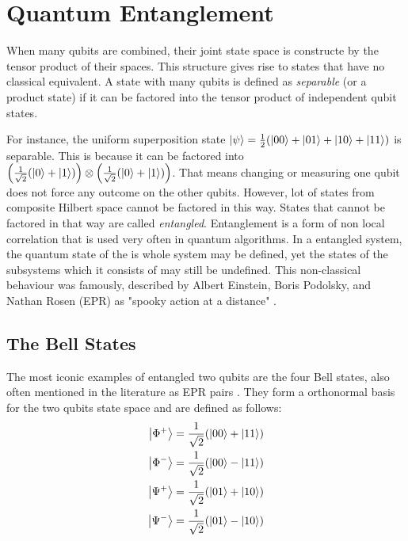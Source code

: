 \section{Quantum Entanglement}

When many qubits are combined, their joint state space is constructe by the tensor product of their spaces.
This structure gives rise to states that have no classical equivalent.
%
%
A state with many qubits is defined as \textit{separable} (or a product state) 
if it can be factored into the tensor product of independent qubit states.
%
%

For instance, the uniform superposition state $\ket{\psi} = \frac{1}{2}(\ket{00} + \ket{01} + \ket{10} + \ket{11})$ is separable.
This is because it can be factored into 
%
%
$\left(\frac{1}{\sqrt{2}}(\ket{0} + \ket{1})\right) \otimes \left(\frac{1}{\sqrt{2}}(\ket{0} + \ket{1})\right)$. 
%
%
That means changing or measuring one qubit does not force any outcome on the other qubits.
%
%
However, lot of states from composite Hilbert space cannot be factored in this way.
%
%
States that cannot be factored in that way are called \textit{entangled}.
%
%
Entanglement is a form of non local correlation that is used very often in quantum algorithms.
%
%
In a entangled system, the quantum state of the  is whole system may be defined, 
yet the states of the subsystems which it consists of may still be undefined.
%
%
This non-classical behaviour was famously, described by 
Albert Einstein, Boris Podolsky, and Nathan Rosen (EPR) as "spooky action at a distance" \cite{einstein1935}.
%
%
\subsection{The Bell States}

The most iconic examples of entangled two qubits are the four Bell states, 
also often mentioned in the literature as EPR pairs \cite{nielsen2010quantum}.
%
%
They form a orthonormal basis for the two qubits state space and are defined as follows:
\bigskip
\begin{align}
    \ket{\Phi^+} &= \frac{1}{\sqrt{2}}(\ket{00} + \ket{11}) \\
    \ket{\Phi^-} &= \frac{1}{\sqrt{2}}(\ket{00} - \ket{11}) \\
    \ket{\Psi^+} &= \frac{1}{\sqrt{2}}(\ket{01} + \ket{10}) \\
    \ket{\Psi^-} &= \frac{1}{\sqrt{2}}(\ket{01} - \ket{10})
\end{align}
\bigskip

